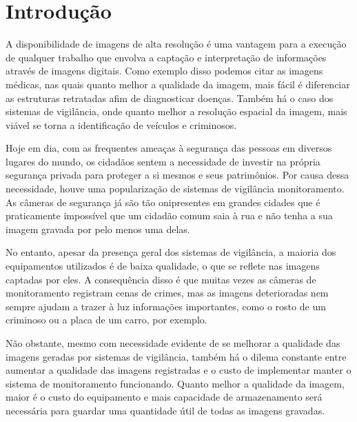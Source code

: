 \documentclass[12pt,openright,oneside,a4paper,english,brazil]{abntex2}
\begin{document}
\tableofcontents*
\cleardoublepage



\textual

\chapter[Introdução]{Introdução}

A disponibilidade de imagens de alta resolução é uma vantagem para a execução de qualquer trabalho que envolva a captação e interpretação de informações através de imagens digitais.
Como exemplo disso podemos citar as imagens médicas, nas quais quanto melhor a qualidade da imagem, mais fácil é diferenciar as estruturas retratadas afim de diagnosticar doenças.
Também há o caso dos sistemas de vigilância, onde quanto melhor a resolução espacial da imagem, mais viável se torna a identificação de veículos e criminosos.

Hoje em dia, com as frequentes ameaças à segurança das pessoas em diversos lugares do mundo, os cidadãos sentem a necessidade de investir na própria segurança privada para proteger a si mesmos e seus patrimônios.
Por causa dessa necessidade, houve uma popularização de sistemas de vigilância monitoramento.
As câmeras de segurança já são tão onipresentes em grandes cidades que é praticamente impossível que um cidadão comum saia à rua e não tenha a sua imagem gravada por pelo menos uma delas.

No entanto, apesar da presença geral dos sistemas de vigilância, a maioria dos equipamentos utilizados é de baixa qualidade, o que se reflete nas imagens captadas por eles.
A consequência disso é que muitas vezes as câmeras de monitoramento registram cenas de crimes,
mas as imagens deterioradas nem sempre ajudam a trazer à luz informações importantes, como o rosto de um criminoso ou a placa de um carro, por exemplo.

Não obstante, mesmo com necessidade evidente de se melhorar a qualidade das imagens geradas por sistemas de vigilância,
também há o dilema constante entre aumentar a qualidade das imagens registradas e o custo de implementar manter o sistema de monitoramento funcionando.
Quanto melhor a qualidade da imagem, maior é o custo do equipamento e mais capacidade de armazenamento será necessária para guardar uma quantidade útil de todas as imagens gravadas.
\end{document}
